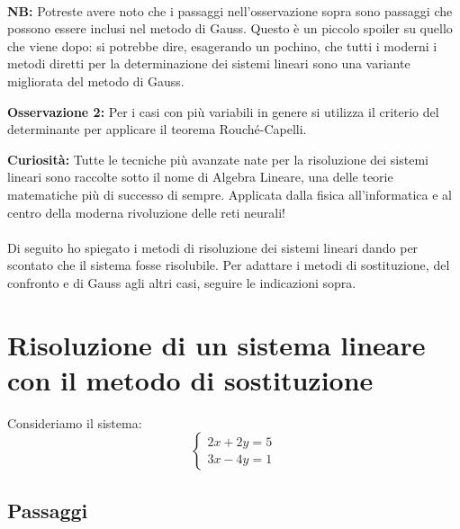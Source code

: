 \documentclass{article}
\begin{document}
\paragraph{}
\textbf{NB:}
Potreste avere noto che i passaggi nell'osservazione sopra sono passaggi che possono essere inclusi nel metodo di Gauss. Questo è un piccolo spoiler su quello che viene dopo: si potrebbe dire, esagerando un pochino, che tutti i moderni i metodi diretti per la determinazione dei sistemi lineari sono una variante migliorata del metodo di Gauss.


\textbf{Osservazione 2:}
Per i casi con più variabili in genere si utilizza il criterio del determinante per applicare il teorema Rouché-Capelli.

\textbf{Curiosità:}
Tutte le tecniche più avanzate nate per la risoluzione dei sistemi lineari sono raccolte sotto il nome di Algebra Lineare, una delle teorie matematiche più di successo di sempre. Applicata dalla fisica all'informatica e al centro della moderna rivoluzione delle reti neurali!

\paragraph{}
Di seguito ho spiegato i metodi di risoluzione dei sistemi lineari dando per scontato che il sistema fosse risolubile. Per adattare i metodi di sostituzione, del confronto e di Gauss agli altri casi, seguire le indicazioni sopra.

\section*{Risoluzione di un sistema lineare con il metodo di sostituzione}

Consideriamo il sistema:
\begin{equation*}
\begin{cases}
2x + 2y = 5 \\
3x - 4y = 1
\end{cases}
\end{equation*}

\subsection*{Passaggi}
\end{document}
